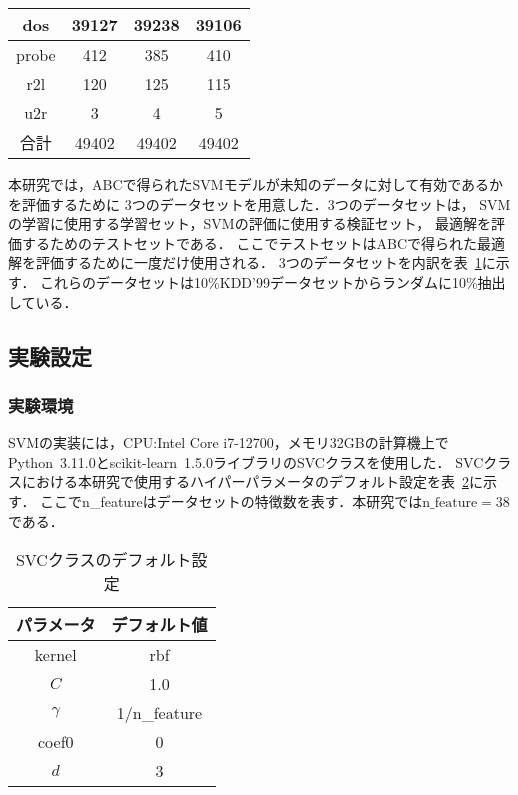 \begin{table}[tb]
\begin{minipage}{0.45\textwidth}
\begin{tabular}{|c|c|c|c|}
          \hline  %
          dos & 39127 & 39238 & 39106 \\  %
          \hline  %
          probe & 412 & 385 & 410 \\  %
          \hline  %
          r2l & 120 & 125 & 115 \\  %
          \hline  %
          u2r & 3 & 4 & 5 \\  %
          \hline  %
          合計 & 49402 & 49402 & 49402 \\  %
          \hline  %
        \end{tabular}
        \label{3kdd99}  %
    \end{minipage}
  \end{table}
本研究では，ABCで得られたSVMモデルが未知のデータに対して有効であるかを評価するために
3つのデータセットを用意した\cite{origin}．3つのデータセットは，
SVMの学習に使用する学習セット，SVMの評価に使用する検証セット，
最適解を評価するためのテストセットである．
ここでテストセットはABCで得られた最適解を評価するために一度だけ使用される．
3つのデータセットを内訳を表~\ref{3kdd99}に示す．
これらのデータセットは10\%KDD'99データセットからランダムに10\%抽出している．
\subsection{実験設定}
\subsubsection{実験環境}
SVMの実装には，CPU:Intel Core i7-12700，メモリ32GBの計算機上で
Python~3.11.0とscikit-learn~1.5.0ライブラリのSVCクラスを使用した．
SVCクラスにおける本研究で使用するハイパーパラメータのデフォルト設定を表~\ref{default}に示す．
ここでn\_featureはデータセットの特徴数を表す．本研究では$\text{n\_feature}=38$である．
\begin{table}[tb]
    \centering
    \caption{SVCクラスのデフォルト設定}
    \begin{tabular}{|c|c|}  %
      \hline  %
      パラメータ & デフォルト値 \\  %
      \hline  %
      kernel & rbf\\  %
      \hline  %
      $C$ & 1.0 \\  %
      \hline  %
      $\gamma$ & 1/n\_feature\\  %
      \hline  %
      coef0 & 0\\  %
      \hline  %
      $d$ & 3\\  %
      \hline  %
  \end{tabular}
    \label{default}  %
  \end{table}
